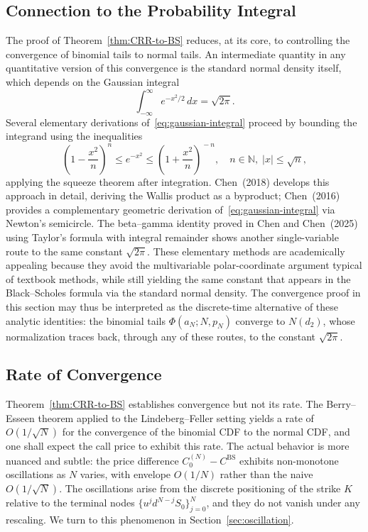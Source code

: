 \documentclass[11pt,a4paper]{article}
\theoremstyle{plain}
\theoremstyle{definition}
\newcommand{\N}{\mathbb{N}}
\begin{document}
\subsection{Connection to the Probability Integral}
\label{subsec:probability-integral}

The proof of Theorem~\ref{thm:CRR-to-BS} reduces, at its core, to
controlling the convergence of binomial tails to normal tails. An
intermediate quantity in any quantitative version of this convergence
is the standard normal density itself, which depends on the Gaussian
integral
\begin{equation}
    \label{eq:gaussian-integral}
    \int_{-\infty}^{\infty} e^{-x^2/2}\, dx = \sqrt{2\pi}.
\end{equation}
Several elementary derivations of~\eqref{eq:gaussian-integral} proceed by
bounding the integrand using the inequalities
\begin{equation}
    \label{eq:exp-bounds}
    \left(1 - \frac{x^2}{n}\right)^{\!n} \leq e^{-x^2}
    \leq \left(1 + \frac{x^2}{n}\right)^{\!-n},
    \quad n \in \N,\;|x| \leq \sqrt{n},
\end{equation}
applying the squeeze theorem after integration. Chen~(2018) develops
this approach in detail, deriving the Wallis product as a byproduct;
Chen~(2016) provides a complementary geometric derivation
of~\eqref{eq:gaussian-integral} via Newton's semicircle. The
beta--gamma identity proved in Chen and Chen~(2025) using Taylor's
formula with integral remainder shows another single-variable
route to the same constant $\sqrt{2\pi}$. These elementary methods are academically
appealing because they avoid the multivariable
polar-coordinate argument typical of textbook methods, while still
yielding the same constant that appears in the Black--Scholes
formula via the standard normal density. The convergence proof in this
section may thus be interpreted as the discrete-time alternative of these
analytic identities: the binomial tails $\Phi(a_N; N, p_N)$ converge to
$N(d_2)$, whose normalization traces back, through any of these routes,
to the constant $\sqrt{2\pi}$.

\subsection{Rate of Convergence}
\label{subsec:rate}

Theorem~\ref{thm:CRR-to-BS} establishes convergence but not its rate.
The Berry--Esseen theorem applied to the Lindeberg--Feller setting
yields a rate of $O(1/\sqrt{N})$ for the convergence of the binomial CDF
to the normal CDF, and one shall expect the call price to exhibit this
rate. The actual behavior is more nuanced and subtle: the price difference
$C_0^{(N)} - C^{\mathrm{BS}}$ exhibits non-monotone oscillations as $N$
varies, with envelope $O(1/N)$ rather than the naive $O(1/\sqrt{N})$.
The oscillations arise from the discrete positioning of the strike $K$
relative to the terminal nodes $\{u^j d^{N-j} S_0\}_{j=0}^N$, and they
do not vanish under any rescaling. We turn to this phenomenon in
Section~\ref{sec:oscillation}.
\end{document}
